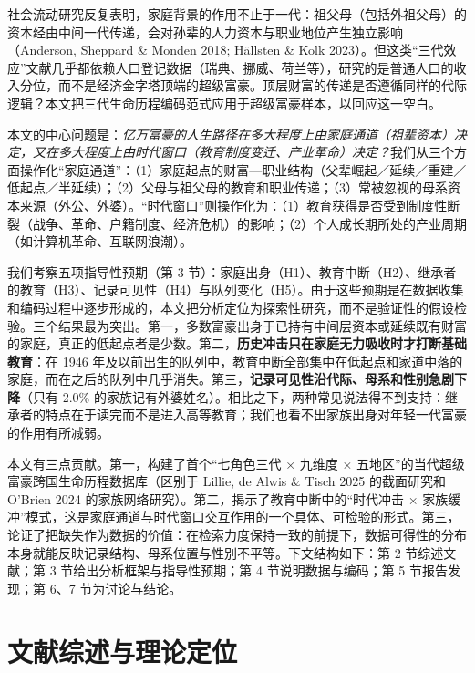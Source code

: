 \documentclass[UTF8,a4paper,11pt]{ctexart}
\begin{document}
社会流动研究反复表明，家庭背景的作用不止于一代：祖父母（包括外祖父母）的资本经由中间一代传递，会对孙辈的人力资本与职业地位产生独立影响（Anderson, Sheppard \& Monden 2018; Hällsten \& Kolk 2023）。但这类“三代效应”文献几乎都依赖人口登记数据（瑞典、挪威、荷兰等），研究的是普通人口的收入分位，而不是经济金字塔顶端的超级富豪。顶层财富的传递是否遵循同样的代际逻辑？本文把三代生命历程编码范式应用于超级富豪样本，以回应这一空白。

本文的中心问题是：\emph{亿万富豪的人生路径在多大程度上由家庭通道（祖辈资本）决定，又在多大程度上由时代窗口（教育制度变迁、产业革命）决定？}我们从三个方面操作化“家庭通道”：（1）家庭起点的财富—职业结构（父辈崛起／延续／重建／低起点／半延续）；（2）父母与祖父母的教育和职业传递；（3）常被忽视的母系资本来源（外公、外婆）。“时代窗口”则操作化为：（1）教育获得是否受到制度性断裂（战争、革命、户籍制度、经济危机）的影响；（2）个人成长期所处的产业周期（如计算机革命、互联网浪潮）。

我们考察五项指导性预期（第 3 节）：家庭出身（H1）、教育中断（H2）、继承者的教育（H3）、记录可见性（H4）与队列变化（H5）。由于这些预期是在数据收集和编码过程中逐步形成的，本文把分析定位为探索性研究，而不是验证性的假设检验。三个结果最为突出。第一，多数富豪出身于已持有中间层资本或延续既有财富的家庭，真正的低起点者是少数。第二，\textbf{历史冲击只在家庭无力吸收时才打断基础教育}：在 1946 年及以前出生的队列中，教育中断全部集中在低起点和家道中落的家庭，而在之后的队列中几乎消失。第三，\textbf{记录可见性沿代际、母系和性别急剧下降}（只有 2.0\% 的家族记有外婆姓名）。相比之下，两种常见说法得不到支持：继承者的特点在于读完而不是进入高等教育；我们也看不出家族出身对年轻一代富豪的作用有所减弱。

本文有三点贡献。第一，构建了首个“七角色三代 × 九维度 × 五地区”的当代超级富豪跨国生命历程数据库（区别于 Lillie, de Alwis \& Tisch 2025 的截面研究和 O'Brien 2024 的家族网络研究）。第二，揭示了教育中断中的“时代冲击 × 家族缓冲”模式，这是家庭通道与时代窗口交互作用的一个具体、可检验的形式。第三，论证了把缺失作为数据的价值：在检索力度保持一致的前提下，数据可得性的分布本身就能反映记录结构、母系位置与性别不平等。下文结构如下：第 2 节综述文献；第 3 节给出分析框架与指导性预期；第 4 节说明数据与编码；第 5 节报告发现；第 6、7 节为讨论与结论。

\section{文献综述与理论定位}
\label{sec:lit}
\end{document}
